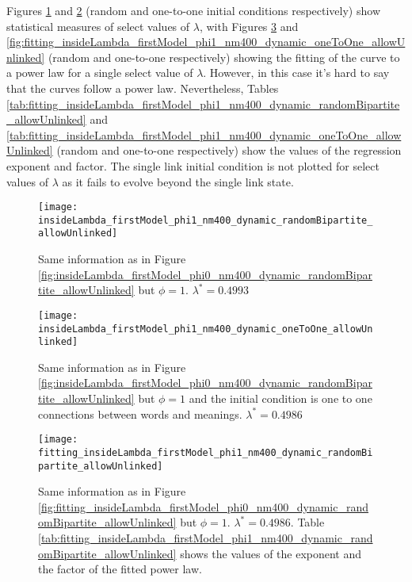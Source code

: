 Figures \ref{fig:insideLambda_firstModel_phi1_nm400_dynamic_randomBipartite_allowUnlinked} and \ref{fig:insideLambda_firstModel_phi1_nm400_dynamic_oneToOne_allowUnlinked} (random and one-to-one initial conditions respectively) show statistical measures of select values of $\lambda$, with Figures \ref{fig:fitting_insideLambda_firstModel_phi1_nm400_dynamic_randomBipartite_allowUnlinked} and \ref{fig:fitting_insideLambda_firstModel_phi1_nm400_dynamic_oneToOne_allowUnlinked} (random and one-to-one respectively) showing the fitting of the curve to a power law for a single select value of $\lambda$.
However, in this case it's hard to say that the curves follow a power law.
Nevertheless, Tables \ref{tab:fitting_insideLambda_firstModel_phi1_nm400_dynamic_randomBipartite_allowUnlinked} and \ref{tab:fitting_insideLambda_firstModel_phi1_nm400_dynamic_oneToOne_allowUnlinked} (random and one-to-one respectively) show the values of the regression exponent and factor.
The single link initial condition is not plotted for select values of $\lambda$ as it fails to evolve beyond the single link state.

\begin{figure}
  \centering
  \texttt{[image: insideLambda\_firstModel\_phi1\_nm400\_dynamic\_randomBipartite\_allowUnlinked]}
  \caption{Same information as in Figure \ref{fig:insideLambda_firstModel_phi0_nm400_dynamic_randomBipartite_allowUnlinked} but $\phi=1$. $\lambda^* = 0.4993$}
  \label{fig:insideLambda_firstModel_phi1_nm400_dynamic_randomBipartite_allowUnlinked}
\end{figure}

\begin{figure}
  \centering
  \texttt{[image: insideLambda\_firstModel\_phi1\_nm400\_dynamic\_oneToOne\_allowUnlinked]}
  \caption{Same information as in Figure \ref{fig:insideLambda_firstModel_phi0_nm400_dynamic_randomBipartite_allowUnlinked} but $\phi=1$ and the initial condition is one to one connections between words and meanings. $\lambda^* = 0.4986$}
  \label{fig:insideLambda_firstModel_phi1_nm400_dynamic_oneToOne_allowUnlinked}
\end{figure}

\begin{figure}
  \centering
  \texttt{[image: fitting\_insideLambda\_firstModel\_phi1\_nm400\_dynamic\_randomBipartite\_allowUnlinked]}
  \caption{Same information as in Figure \ref{fig:fitting_insideLambda_firstModel_phi0_nm400_dynamic_randomBipartite_allowUnlinked} but $\phi=1$. $\lambda^*=0.4986$.
Table \ref{tab:fitting_insideLambda_firstModel_phi1_nm400_dynamic_randomBipartite_allowUnlinked} shows the values of the exponent and the factor of the fitted power law.}
  \label{fig:fitting_insideLambda_firstModel_phi1_nm400_dynamic_randomBipartite_allowUnlinked}
\end{figure}

